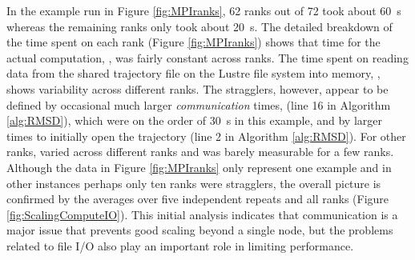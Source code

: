 In the example run in Figure \ref{fig:MPIranks}, 62 ranks out of 72 took about 60~s whereas the remaining ranks only took about 20~s. 
The detailed breakdown of the time spent on each rank (Figure \ref{fig:MPIranks}) shows that time
for the actual computation, \tcomp, was fairly constant across ranks. 
The time spent on reading data from the shared trajectory file on the Lustre file system into memory, \tIO, shows variability across different ranks. 
The stragglers, however, appear to be defined by occasional much larger \emph{communication} times, \tcomm (line 16 in Algorithm \ref{alg:RMSD}), which were on the order of 30~s in this example, and by larger times to initially open the trajectory (line 2 in Algorithm \ref{alg:RMSD}).
For other ranks, \tcomm varied across different ranks and was barely measurable for a few ranks.
Although the data in Figure \ref{fig:MPIranks} only represent one example and in other instances perhaps only ten ranks were stragglers, the overall picture is confirmed by the averages over five independent repeats and all ranks (Figure \ref{fig:ScalingComputeIO}).
This initial analysis indicates that communication is a major issue that prevents good scaling beyond a single node, but the problems related to file I/O also play an important role in limiting performance.

